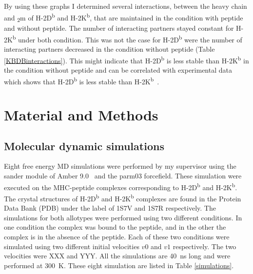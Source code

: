 \documentclass[11pt,twocolumn]{article}
\newcommand{\db}{H-2D\textsuperscript{b}\xspace}
\newcommand{\kb}{H-2K\textsuperscript{b}\xspace}
\newcommand{\btm}{\textbeta\textsubscript{2}m\xspace}
\begin{document}
By using these graphs I determined several interactions, between the heavy chain and \btm of \db and \kb, that are maintained in the condition with peptide and  without peptide. The number of interacting partners stayed constant for \kb under both condition. This was not the case for \db were the number of interacting partners decreased in the condition without peptide (Table \ref{KBDBinteractions}). This might indicate that \db is less stable than \kb in the condition without peptide and can be correlated with experimental data which shows that \db is less stable than \kb~\cite{Shields1999561}.

\section*{Material and Methods}

\subsection*{Molecular dynamic simulations}

Eight free energy MD simulations were  performed by my supervisor using the sander module of Amber 9.0~\cite{case2005amber} and the parm03 forcefield.
These simulation were executed on the  MHC-peptide complexes corresponding to  \db and  \kb. 
The crystal structures of \db and  \kb complexes are found in the Protein Data Bank (PDB) under the label of 1S7V and  1S7R respectively. 
The simulations for both allotypes were performed using two different conditions. 
In one condition the complex was bound to the peptide, and in the other  the complex is in the absence of the peptide. 
Each of these two conditions were simulated using two different initial velocities $v0$ and $v1$ respectively. The two velocities were XXX and YYY. 
All the simulations are \SI{40}{\nano\second} long and were performed  at \SI{300}{\kelvin}. These eight simulation are listed in Table \ref{simulations}.
\end{document}
